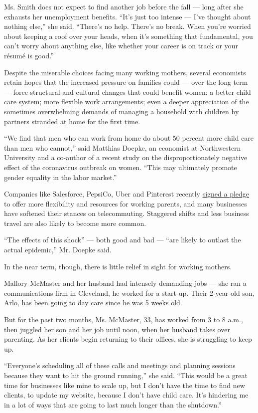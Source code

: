 Ms. Smith does not expect to find another job before the fall --- long
after she exhausts her unemployment benefits. ``It's just too intense
--- I've thought about nothing else,'' she said. ``There's no help.
There's no break. When you're worried about keeping a roof over your
heads, when it's something that fundamental, you can't worry about
anything else, like whether your career is on track or your résumé is
good.''

Despite the miserable choices facing many working mothers, several
economists retain hopes that the increased pressure on families could
--- over the long term --- force structural and cultural changes that
could benefit women: a better child care system; more flexible work
arrangements; even a deeper appreciation of the sometimes overwhelming
demands of managing a household with children by partners stranded at
home for the first time.

``We find that men who can work from home do about 50 percent more child
care than men who cannot,'' said Matthias Doepke, an economist at
Northwestern University and a co-author of a recent study on the
disproportionately negative effect of the coronavirus outbreak on women.
``This may ultimately promote gender equality in the labor market.''

Companies like Salesforce, PepsiCo, Uber and Pinterest recently
\href{https://www.investinparents.com/}{signed a pledge} to offer more
flexibility and resources for working parents, and many businesses have
softened their stances on telecommuting. Staggered shifts and less
business travel are also likely to become more common.

``The effects of this shock'' --- both good and bad --- ``are likely to
outlast the actual epidemic,'' Mr. Doepke said.

In the near term, though, there is little relief in sight for working
mothers.

Mallory McMaster and her husband had intensely demanding jobs --- she
ran a communications firm in Cleveland, he worked for a start-up. Their
2-year-old son, Arlo, has been going to day care since he was 5 weeks
old.

But for the past two months, Ms. McMaster, 33, has worked from 3 to 8
a.m., then juggled her son and her job until noon, when her husband
takes over parenting. As her clients begin returning to their offices,
she is struggling to keep up.

``Everyone's scheduling all of these calls and meetings and planning
sessions because they want to hit the ground running,'' she said. ``This
would be a great time for businesses like mine to scale up, but I don't
have the time to find new clients, to update my website, because I don't
have child care. It's hindering me in a lot of ways that are going to
last much longer than the shutdown.''

